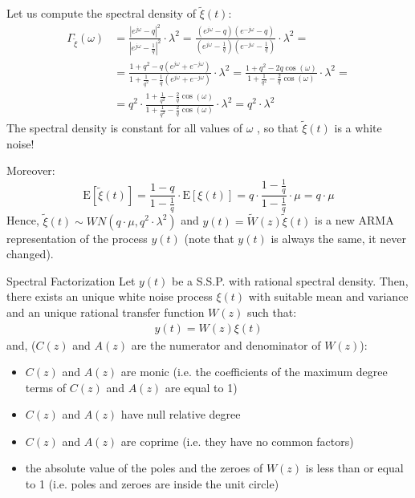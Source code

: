 Let us compute the spectral density of $\tilde{\xi}(t)$:
\begin{align*}
	\Gamma_{\tilde{\xi}}(\omega) &=\frac{\left|e^{j \omega}-q\right|^{2}}{\left|e^{j \omega}-\frac{1}{q}\right|^{2}} \cdot \lambda^{2}=\frac{\left(e^{j \omega}-q\right)\left(e^{-j \omega}-q\right)}{\left(e^{j \omega}-\frac{1}{q}\right)\left(e^{-j \omega}-\frac{1}{q}\right)} \cdot \lambda^{2}=\\
	&=\frac{1+q^{2}-q\left(e^{j \omega}+e^{-j \omega}\right)}{1+\frac{1}{q^{2}}-\frac{1}{q}\left(e^{j \omega}+e^{-j \omega}\right)} \cdot \lambda^{2}=\frac{1+q^{2}-2 q \cos (\omega)}{1+\frac{1}{q^{2}}-\frac{2}{q} \cos (\omega)} \cdot \lambda^{2}=\\
	&=q^2\cdot\frac{1+\frac{1}{q^{2}}-\frac{2}{q} \cos (\omega)}{1+\frac{1}{q^{2}}-\frac{2}{q} \cos (\omega)}\cdot \lambda^{2}=q^2\cdot \lambda^{2}
\end{align*}
The spectral density is constant for all values of $\omega$ , so that $\tilde{\xi}(t)$ is a white noise!

Moreover:
$$\mathrm{E}[\tilde{\xi}(t)]=\frac{1-q}{1-\frac{1}{q}} \cdot \mathrm{E}[\xi(t)]=q \cdot \frac{1-\frac{1}{q}}{1-\frac{1}{q}} \cdot \mu=q \cdot \mu$$
Hence, $\tilde{\xi}(t) \sim W N\left(q \cdot \mu, q^2 \cdot \lambda^{2}\right)$ and $y(t)=\tilde{W}(z) \tilde{\xi}(t)$ is a new ARMA representation of the process $y(t)$ (note that $y(t)$ is always the same, it never changed).

\begin{theorem}{Spectral Factorization}
	Let $y(t)$ be a S.S.P. with rational spectral density. 
	Then, there exists an unique white noise process $\xi(t)$ with suitable 
	mean and variance and an unique rational transfer function $W (z)$ such 
	that:
	\begin{align*}
		y(t) = W (z)\xi (t)
	\end{align*}
    and, ($C(z)$ and $A(z)$ are the numerator and denominator of $W (z)$):
    \begin{itemize}
   \item $C(z)$ and $A(z)$ are monic (i.e. the coefficients of the maximum 
    	degree terms of $C(z)$ and $A(z)$ are equal to 1) 
    	\item $C(z)$ and $A(z)$ have null relative degree
    	\item $C(z)$ and $A(z)$ are coprime (i.e. they have no common factors) 
    	\item the absolute value of the poles and the zeroes of $W (z)$ is less than 
    	or equal to 1 (i.e. poles and zeroes are inside the unit circle)
    \end{itemize}
\end{theorem}

